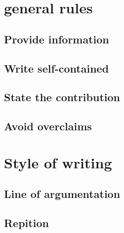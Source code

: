\documentclass[12pt,a4paper]{article}
\begin{document}
\section{general rules}%

\subsection{Provide information}
\subsection{Write self-contained}
\subsection{State the contribution}
\subsection{Avoid overclaims}
\section{Style of writing}
\subsection{Line of argumentation}
\subsection{Repition}
\end{document}
